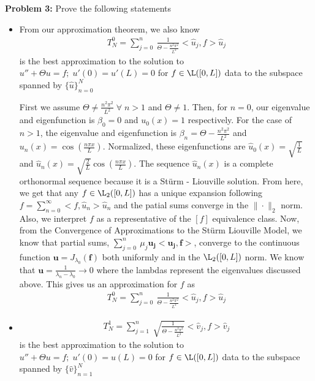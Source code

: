 \documentclass[11pt]{SelfArxOneColBMN}
\begin{document}
\textbf{Problem 3: }Prove the following statements
\begin{itemize}
  \item From our approximation theorem, we also know
  \begin{eqnarray*}
    T_N^0 = \sum_{j=0}^n\:\frac{1}{\Theta - \frac{n^2\pi^2}{L^2}}<\hat{u}_j,f>\hat{u}_j
  \end{eqnarray*}
  is the best approximation to the solution to $u'' + \Theta u = f;\;u'(0) = u'(L) = 0$ for $f \in \L([0,L])$ data to the subspace spanned by $\{\hat{u}\}_{n=0}^N$\\
  \begin{solution}
    First we assume $\Theta \neq \frac{n^2\pi^2}{L^2} \; \forall \; n > 1$ and $\Theta \neq 1$. Then, for $n = 0$, our eigenvalue and eigenfunction is $\beta_0 = 0$ and $u_0(x) = 1$ respectively. For the case of $n > 1$, the eigenvalue and eigenfunction is $\beta_n = \Theta - \frac{n^2\pi^2}{L^2}$ and $u_n(x) = \cos(\frac{n\pi x}{L})$. Normalized, these eigenfunctions are $\hat{u}_0(x) = \sqrt{\frac{1}{L}}$ and $\hat{u}_n(x) = \sqrt{\frac{2}{L}}\cos(\frac{n\pi x}{L})$. The sequence $\hat{u}_n(x)$ is a complete orthonormal sequence because it is a St\"urm - Liouville solution. From here, we get that any $f \in \L_2([0,L])$ has a unique expansion following $f = \sum_{n=0}^\infty<f,\hat{u}_n>\hat{u}_n$ and the patial sums converge in the $\|\cdot\|_2$ norm. Also, we interpret $f$ as a representative of the $[f]$ equivalence class. Now, from the Convergence of Approximations to the St\"urm Liouville Model, we know that partial sums, $\sum_{j=0}^n\:\mu_j\mathbf{u_j}<\mathbf{u_j},\mathbf{f}>$, converge to the continuous function $\mathbf{u} = J_{\lambda_0}(\mathbf{f})$ both uniformly and in the $\L_2([0,L])$ norm. We know that $\mathbf{u} = \frac{1}{\lambda_n - \lambda_0} \rightarrow 0$ where the lambdas represent the eigenvalues discussed above. This gives us
    an approximation for $f$ as
    \begin{eqnarray*}
    T_N^0 = \sum_{j=0}^n\:\frac{1}{\Theta - \frac{n^2\pi^2}{L^2}}<\hat{u}_j,f>\hat{u}_j
  \end{eqnarray*}
  \end{solution}
  \item
  \begin{eqnarray*}
    T_N^1 = \sum_{j=1}^n\:\sqrt{\frac{1}{\Theta - \frac{n^2\pi^2}{L^2}}}<\hat{v}_j,f>\hat{v}_j
  \end{eqnarray*}
  is the best approximation to the solution to $u'' + \Theta u = f;\;u'(0) = u(L) = 0$ for $f \in \L([0,L])$ data to the subspace spanned by $\{\hat{v}\}_{n=1}^N$

\end{itemize}
\end{document}
